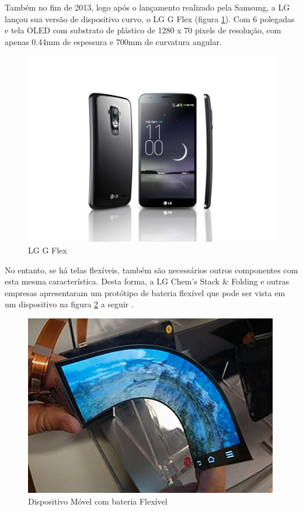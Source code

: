Também no fim de 2013, logo após o lançamento realizado pela Samsung, a LG lançou sua versão de dispositivo curvo, o LG G Flex (figura \ref{fig:g-flex}). Com 6 polegadas e tela OLED com substrato de plástico de 1280 x 70 pixels de resolução, com apenas 0.44mm de espessura e 700mm de curvatura angular.\\

\begin{figure}[!ht]
  \centering
  \includegraphics[width=.70\textwidth]{./figuras/g-flex} 
  \caption{LG G Flex}
  \label{fig:g-flex} 
\end{figure}

No entanto, se há telas flexíveis, também são necessários outros componentes com esta mesma característica. Desta forma, a LG Chem’s Stack \& Folding e outras empresas apresentaram um protótipo de bateria flexível que pode ser vista em um dispositivo na figura \ref{fig:flexible-battery} a seguir \cite{NOLEDDN}.\\

\begin{figure}[!ht]
  \centering
  \includegraphics[width=.80\textwidth]{./figuras/flexible-battery} 
  \caption{Dispositivo Móvel com bateria Flexível}
  \label{fig:flexible-battery} 
\end{figure}


